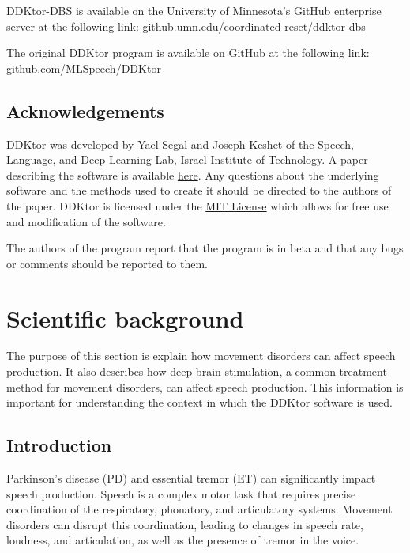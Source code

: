 \documentclass[
]{book}
\begin{document}
DDKtor-DBS is available on the University of Minnesota's GitHub enterprise server at the following link: \href{https://github.umn.edu/coordinated-reset/ddktor-dbs}{github.umn.edu/coordinated-reset/ddktor-dbs}

The original DDKtor program is available on GitHub at the following link: \href{https://github.com/MLSpeech/DDKtor}{github.com/MLSpeech/DDKtor}

\section{Acknowledgements}\label{acknowledgements}

DDKtor was developed by \href{mailto:segal.yael@campus.technion.ac.il}{Yael Segal} and \href{mailto:jkeshet@technion.ac.il}{Joseph Keshet} of the Speech, Language, and Deep Learning Lab, Israel Institute of Technology. A paper describing the software is available \href{https://arxiv.org/abs/2206.14639}{here}. Any questions about the underlying software and the methods used to create it should be directed to the authors of the paper. DDKtor is licensed under the \href{https://opensource.org/licenses/MIT}{MIT License} which allows for free use and modification of the software.

The authors of the program report that the program is in beta and that any bugs or comments should be reported to them.

\chapter{Scientific background}\label{scientific-background}

The purpose of this section is explain how movement disorders can affect speech production. It also describes how deep brain stimulation, a common treatment method for movement disorders, can affect speech production. This information is important for understanding the context in which the DDKtor software is used.

\section{Introduction}\label{introduction}

Parkinson's disease (PD) and essential tremor (ET) can significantly impact speech production. Speech is a complex motor task that requires precise coordination of the respiratory, phonatory, and articulatory systems. Movement disorders can disrupt this coordination, leading to changes in speech rate, loudness, and articulation, as well as the presence of tremor in the voice.
\end{document}
